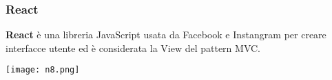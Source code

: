 \begin{frame}
\frametitle{React}
	\par
  	\textbf{React} è una libreria JavaScript usata da Facebook e Instangram per creare interfacce utente ed è considerata la View del pattern MVC.\\
	\begin{flushleft}
		\texttt{[image: n8.png]}
	\end{flushleft}
\end{frame}


